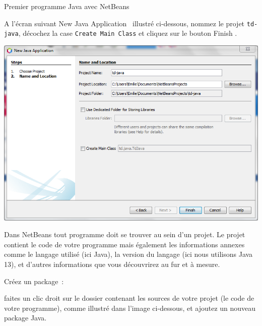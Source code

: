 \documentclass[a4paper,11pt]{style-esi/td}
\begin{document}
\begin{Tutoriel}{Premier programme Java avec NetBeans}
\begin{steps}
		A l'écran suivant \og New Java Application \fg~illustré ci-dessous,
		nommez le projet \texttt{td-java}, décochez la case \texttt{Create Main Class} et cliquez sur le bouton \og Finish \fg.

		\begin{center}
			\includegraphics[width=.9\textwidth]{images/anb113_newproject_name}
		\end{center}
\newpage
		Dans NetBeans tout programme doit se trouver au sein d'un projet.
		Le projet contient le code de votre programme mais également les
		informations annexes comme le langage utilisé (ici Java),
		la version du langage (ici nous utilisons Java 13),
		et d'autres informations que vous découvrirez au fur et à mesure.



		\item Créez un package~:

		faites un clic droit sur le dossier contenant les sources de votre projet
		(le code de votre programme), comme illustré dans l'image ci-dessous,
		et ajoutez un nouveau package Java.


\end{steps}
\end{Tutoriel}
\end{document}
